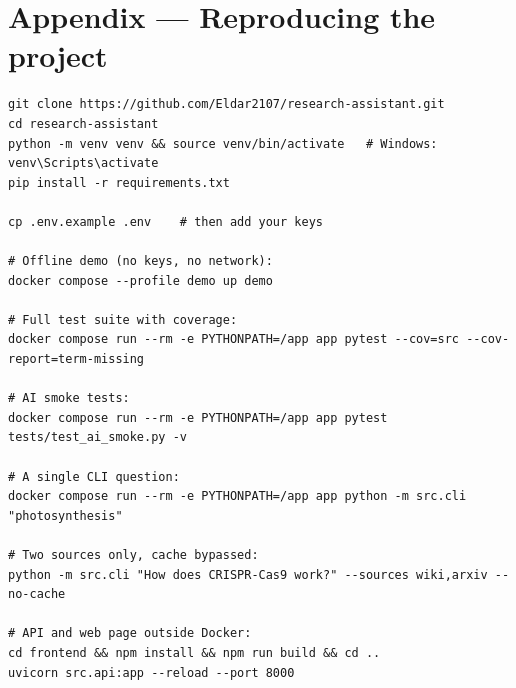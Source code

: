 \documentclass[11pt,a4paper]{article}
\begin{document}
\appendix
\section{Appendix --- Reproducing the project}

\begin{lstlisting}[style=shell,caption={From clone to a running answer}]
git clone https://github.com/Eldar2107/research-assistant.git
cd research-assistant
python -m venv venv && source venv/bin/activate   # Windows: venv\Scripts\activate
pip install -r requirements.txt

cp .env.example .env    # then add your keys

# Offline demo (no keys, no network):
docker compose --profile demo up demo

# Full test suite with coverage:
docker compose run --rm -e PYTHONPATH=/app app pytest --cov=src --cov-report=term-missing

# AI smoke tests:
docker compose run --rm -e PYTHONPATH=/app app pytest tests/test_ai_smoke.py -v

# A single CLI question:
docker compose run --rm -e PYTHONPATH=/app app python -m src.cli "photosynthesis"

# Two sources only, cache bypassed:
python -m src.cli "How does CRISPR-Cas9 work?" --sources wiki,arxiv --no-cache

# API and web page outside Docker:
cd frontend && npm install && npm run build && cd ..
uvicorn src.api:app --reload --port 8000
\end{lstlisting}
\end{document}
